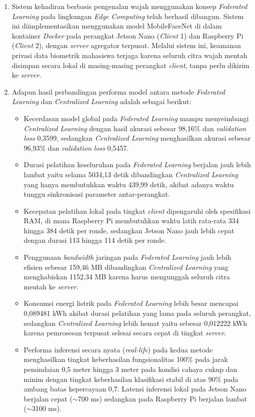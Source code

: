 \documentclass[conference]{IEEEtran}
\begin{document}
\begin{enumerate}
    \item Sistem kehadiran berbasis pengenalan wajah menggunakan konsep \textit{Federated Learning} pada lingkungan \textit{Edge Computing} telah berhasil dibangun. Sistem ini diimplementasikan menggunakan model MobileFaceNet di dalam kontainer \textit{Docker} pada perangkat Jetson Nano (\textit{Client} 1) dan Raspberry Pi (\textit{Client} 2), dengan \textit{server} agregator terpusat. Melalui sistem ini, keamanan privasi data biometrik mahasiswa terjaga karena seluruh citra wajah mentah disimpan secara lokal di masing-masing perangkat \textit{client}, tanpa perlu dikirim ke \textit{server}.
    \item Adapun hasil perbandingan performa model antara metode \textit{Federated Learning} dan \textit{Centralized Learning} adalah sebagai berikut:
    \begin{itemize}
        \item Kecerdasan model global pada \textit{Federated Learning} mampu menyeimbangi \textit{Centralized Learning} dengan hasil akurasi sebesar 98,16\% dan \textit{validation loss} 0,3599, sedangkan \textit{Centralized Learning} menghasilkan akurasi sebesar 96,93\% dan \textit{validation loss} 0,5457.
        \item Durasi pelatihan keseluruhan pada \textit{Federated Learning} berjalan jauh lebih lambat yaitu selama 5034,13 detik dibandingkan \textit{Centralized Learning} yang hanya membutuhkan waktu 439,99 detik, akibat adanya waktu tunggu sinkronisasi parameter antar-perangkat.
        \item Kecepatan pelatihan lokal pada tingkat \textit{client} dipengaruhi oleh spesifikasi RAM, di mana Raspberry Pi membutuhkan waktu latih rata-rata 334 hingga 384 detik per ronde, sedangkan Jetson Nano jauh lebih cepat dengan durasi 113 hingga 114 detik per ronde.
        \item Penggunaan \textit{bandwidth} jaringan pada \textit{Federated Learning} jauh lebih efisien sebesar 159,46 MB dibandingkan \textit{Centralized Learning} yang menghabiskan 1152,34 MB karena harus mengunggah seluruh citra mentah ke \textit{server}.
        \item Konsumsi energi listrik pada \textit{Federated Learning} lebih besar mencapai 0,089481 kWh akibat durasi pelatihan yang lama pada seluruh perangkat, sedangkan \textit{Centralized Learning} lebih hemat yaitu sebesar 0,012222 kWh karena pemrosesan terpusat selesai secara cepat di tingkat \textit{server}.
        \item Performa inferensi secara nyata (\textit{real-life}) pada kedua metode menghasilkan tingkat keberhasilan fungsionalitas 100\% pada jarak pemindaian 0,5 meter hingga 3 meter pada kondisi cahaya cukup dan minim dengan tingkat keberhasilan klasifikasi stabil di atas 90\% pada ambang batas kepercayaan 0,7. Latensi inferensi lokal pada Jetson Nano berjalan cepat ($\sim$700 ms) sedangkan pada Raspberry Pi berjalan lambat ($\sim$3100 ms).

\end{itemize}
\end{enumerate}
\end{document}
